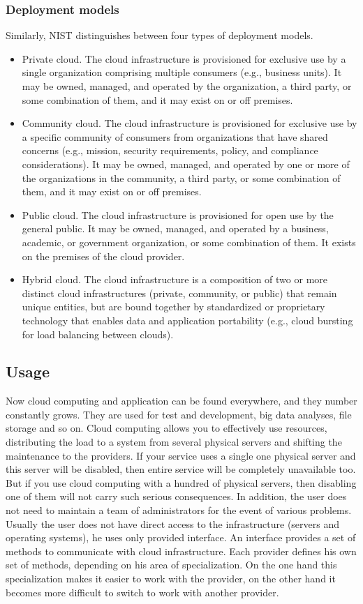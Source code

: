 \subsubsection*{Deployment models}
Similarly, NIST distinguishes between four types of deployment models.
\begin{itemize}
	\item Private cloud. 
	The cloud infrastructure is provisioned for exclusive use by a single organization comprising multiple consumers (e.g., business units). It may be owned, managed, and operated by the organization, a third party, or some combination of them, and it may exist on or off premises.
\item Community cloud.
	The cloud infrastructure is provisioned for exclusive use by a specific community of consumers from organizations that have shared concerns (e.g., mission, security requirements, policy, and compliance considerations).
	It may be owned, managed, and operated by one or more of the organizations in the community, a third party, or some combination of them, and it may exist on or off premises.
\item Public cloud.
	The cloud infrastructure is provisioned for open use by the general public. 
	It may be owned, managed, and operated by a business, academic, or government organization, or some combination of them.
	It exists on the premises of the cloud provider.
\item Hybrid cloud. 
	The cloud infrastructure is a composition of two or more distinct cloud infrastructures (private, community, or public) that remain unique entities, but are bound together by standardized or proprietary technology that enables data and application portability (e.g., cloud bursting for load balancing between clouds). 
\end{itemize}

\subsection{Usage}
Now cloud computing and application can be found everywhere, and they number constantly grows. \cite*{cloud_stat}
They are used for test and development, big data analyses, file storage and so on.
Cloud computing allows you to effectively use resources, distributing the load to a system from several physical servers and shifting the maintenance to the providers. 
If your service uses a single one physical server and this server will be disabled, then entire service will be completely unavailable too.
But if you use cloud computing with a hundred of physical servers, then disabling one of them will not carry such serious consequences.
In addition, the user does not need to maintain a team of administrators for the event of various problems.\\
Usually the user does not have direct access to the infrastructure (servers and operating systems), he uses only provided interface.
An interface provides a set of methods to communicate with cloud infrastructure. 
Each provider defines his own set of methods, depending on his area of specialization. 
On the one hand this specialization makes it easier to work with the provider, on the other hand it becomes more difficult to switch to work with another provider.

